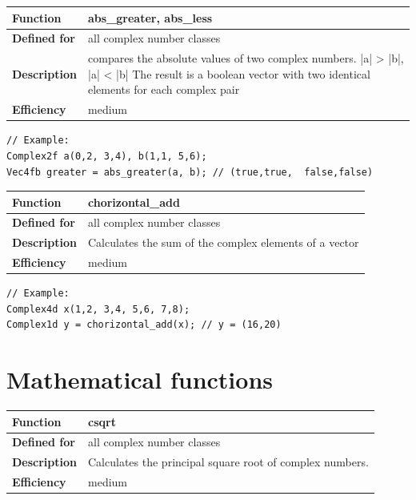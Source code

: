 \documentclass[11pt,a4paper,oneside,openright]{report}
\newcommand{\vspacesmall}{\vspace{3mm}}
\newcommand{\vspacebig}{\vspace{6mm}}
\begin{document}
\begin{tabular}{|p{25mm}|p{100mm}|}
\hline
\bfseries Function & abs\_greater, abs\_less \\ \hline
\bfseries Defined for & all complex number classes  \\ \hline
\bfseries Description & compares the absolute values of two complex numbers.\newline
|a| > |b|, |a| < |b|
\newline
The result is a boolean vector with two identical elements for each complex pair \\ \hline
\bfseries Efficiency & medium \\ \hline
\end{tabular}
\vspacesmall

\begin{lstlisting}[frame=none]
// Example:
Complex2f a(0,2, 3,4), b(1,1, 5,6);
Vec4fb greater = abs_greater(a, b); // (true,true,  false,false)
\end{lstlisting}
\vspacebig

\begin{tabular}{|p{28mm}|p{100mm}|}
\hline
\bfseries Function & chorizontal\_add \\ \hline
\bfseries Defined for & all complex number classes  \\ \hline
\bfseries Description & Calculates the sum of the complex elements of a vector \\ \hline
\bfseries Efficiency & medium \\ \hline
\end{tabular}
\vspacesmall

\begin{lstlisting}[frame=none]
// Example:
Complex4d x(1,2, 3,4, 5,6, 7,8);
Complex1d y = chorizontal_add(x); // y = (16,20)
\end{lstlisting}
\vspacebig


\chapter{Mathematical functions}\label{chap:MathematicalFunctions}

\begin{tabular}{|p{25mm}|p{100mm}|}
\hline
\bfseries Function & csqrt \\ \hline
\bfseries Defined for & all complex number classes  \\ \hline
\bfseries Description & Calculates the principal square root of complex numbers. \\ \hline
\bfseries Efficiency & medium \\ \hline
\end{tabular}
\vspacesmall
\end{document}
